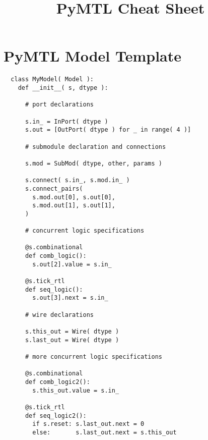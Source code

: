 \documentclass{cbxdoc}
\title{PyMTL Cheat Sheet}
\begin{document}


\maketitle
\bigskip


\section{PyMTL Model Template}

\begin{lstlisting}
  class MyModel( Model ):
    def __init__( s, dtype ):

      # port declarations

      s.in_ = InPort( dtype )
      s.out = [OutPort( dtype ) for _ in range( 4 )]

      # submodule declaration and connections

      s.mod = SubMod( dtype, other, params )

      s.connect( s.in_, s.mod.in_ )
      s.connect_pairs(
        s.mod.out[0], s.out[0],
        s.mod.out[1], s.out[1],
      )

      # concurrent logic specifications

      @s.combinational
      def comb_logic():
        s.out[2].value = s.in_

      @s.tick_rtl
      def seq_logic():
        s.out[3].next = s.in_

      # wire declarations

      s.this_out = Wire( dtype )
      s.last_out = Wire( dtype )

      # more concurrent logic specifications

      @s.combinational
      def comb_logic2():
        s.this_out.value = s.in_

      @s.tick_rtl
      def seq_logic2():
        if s.reset: s.last_out.next = 0
        else:       s.last_out.next = s.this_out
\end{lstlisting}

\clearpage

\end{document}
